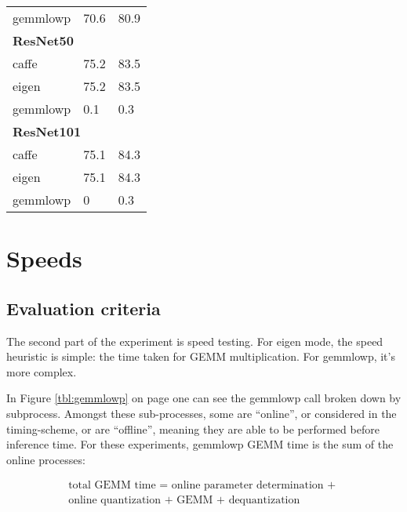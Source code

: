 \begin{table}[]
\begin{tabular}{lll}
gemmlowp             & 70.6                                         & 80.9                                         \\
\multicolumn{3}{l}{\textbf{ResNet50}}                                                                             \\
caffe                & 75.2                                        & 83.5                                        \\
eigen                & 75.2                                         & 83.5                                        \\
gemmlowp             & 0.1                                         & 0.3                                          \\
\multicolumn{3}{l}{\textbf{ResNet101}}                                                                          \\
caffe                & 75.1                                          & 84.3                 \\
eigen                & 75.1                                        & 84.3                   \\
gemmlowp             & 0                                             & 0.3                                         
\end{tabular}
\end{table}

\section{Speeds}
\subsection{Evaluation criteria}
The second part of the experiment is speed testing. For eigen mode, the speed heuristic is simple: the time taken for GEMM multiplication. For gemmlowp, it's more complex.

In Figure \ref{tbl:gemmlowp} on page \pageref{tbl:gemmlowp} one can see the gemmlowp call broken down by subprocess. Amongst these sub-processes, some are ``online'', or considered in the timing-scheme, or are ``offline'', meaning they are able to be performed before inference time. For these experiments, gemmlowp GEMM time is the sum of the online processes:

\begin{equation}
\label{eqn:quantgemm}
\begin{split}
\text{total GEMM time = } \text{online parameter determination + } \\
\text{online quantization + } 
\text{GEMM + } \text{dequantization}
\end{split}
\end{equation}

